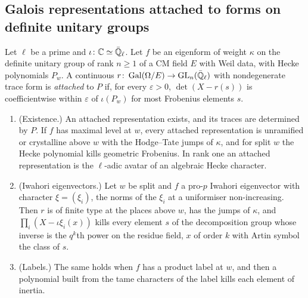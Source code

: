 \subsection{Galois representations attached to forms on definite unitary groups}\label{ss:B-galois}
Let $\ell$ be a prime and $\iota\colon\mathbb{C}\simeq\bar{\mathbb{Q}}_\ell$. Let $f$ be an eigenform of weight $\kappa$ on the definite unitary group of rank $n\ge1$ of a CM field $E$ with Weil data, with Hecke polynomials $P_w$. A continuous
$r\colon\operatorname{Gal}(\Omega/E)\to\operatorname{GL}_n(\bar{\mathbb{Q}}_\ell)$ with nondegenerate trace form is \emph{attached} to $P$ if, for every $\varepsilon>0$, $\det(X-r(s))$ is coefficientwise within $\varepsilon$ of $\iota(P_w)$ for most Frobenius elements $s$.

\begin{theorem}\label{thm:B-galois}
\begin{enumerate}[label=\textup{(\alph*)}]
\item (Existence.) An attached representation exists, and its traces are determined by $P$. If $f$ has maximal level at $w$, every attached representation is unramified or crystalline above $w$ with the Hodge--Tate jumps of
$\kappa$, and for split $w$ the Hecke polynomial kills geometric Frobenius. In rank one an attached representation is the $\ell$-adic avatar of an algebraic Hecke character.
\item (Iwahori eigenvectors.) Let $w$ be split and $f$ a pro-$p$ Iwahori eigenvector with character $\xi=(\xi_i)$, the norms of the $\xi_i$ at a uniformiser non-increasing. Then $r$ is of finite type at the places above $w$, has
the jumps of $\kappa$, and $\prod_i(X-\iota\xi_i(x))$ kills every element $s$ of the decomposition group whose inverse is the $q^k$th power on the residue field, $x$ of order $k$ with Artin symbol the class of $s$.
\item (Labels.) The same holds when $f$ has a product label at $w$, and then a polynomial built from the tame characters of the label kills each element of inertia.
\end{enumerate}
\end{theorem}

